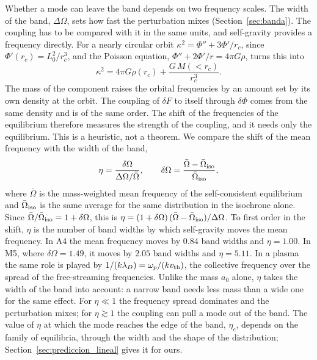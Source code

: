 \documentclass[11pt,a4paper]{article}
\begin{document}
Whether a mode can leave the band depends on two frequency scales. The width of the band,
$\Delta\Omega$, sets how fast the perturbation mixes (Section~\ref{sec:banda}). The coupling has to
be compared with it in the same units, and self-gravity provides a frequency directly. For a
nearly circular orbit $\kappa^2=\Phi''+3\Phi'/r_c$, since $\Phi'(r_c)=L_0^2/r_c^3$, and the Poisson
equation, $\Phi''+2\Phi'/r=4\pi G\rho$, turns this into
\[
  \kappa^2=4\pi G\rho(r_c)+\frac{G\,M(<r_c)}{r_c^3}.
\]
The mass of the component raises the orbital frequencies by an amount set by its own
density at the orbit. The coupling of $\delta F$ to itself through $\delta\Phi$ comes from the same
density and is of the same order. The shift of the frequencies of the equilibrium therefore
measures the strength of the coupling, and it needs only the equilibrium. This is a
heuristic, not a theorem. We compare the shift of the mean frequency with the width of the
band,
\[
  \eta=\frac{\delta\Omega}{\Delta\Omega/\bar\Omega},\qquad
  \delta\Omega=\frac{\bar\Omega-\bar\Omega_{\rm iso}}{\bar\Omega_{\rm iso}},
\]
where $\bar\Omega$ is the mass-weighted mean frequency of the self-consistent
equilibrium and $\bar\Omega_{\rm iso}$ is the same average for the same distribution
in the isochrone alone. Since $\bar\Omega/\bar\Omega_{\rm iso}=1+\delta\Omega$, this is
$\eta=(1+\delta\Omega)\,(\bar\Omega-\bar\Omega_{\rm iso})/\Delta\Omega$. To first order in the shift, $\eta$
is the number of band widths by which self-gravity moves the mean frequency. In A4 the mean
frequency moves by $0.84$ band widths and $\eta=1.00$. In M5, where $\delta\Omega=1.49$, it moves
by $2.05$ band widths and $\eta=5.11$. In a plasma the same role is played by
$1/(k\lambda_D)=\omega_p/(kv_{\rm th})$, the collective frequency over the spread of the free-streaming
frequencies. Unlike the mass $a_0$ alone, $\eta$ takes the width of the band into account: a
narrow band needs less mass than a wide one for the same effect. For $\eta\ll1$ the
frequency spread dominates and the perturbation mixes; for $\eta\gtrsim1$ the coupling can
pull a mode out of the band. The value of $\eta$ at which the mode reaches the edge of the
band, $\eta_c$, depends on the family of equilibria, through the width and the shape of the
distribution; Section~\ref{sec:prediccion_lineal} gives it for ours.
\end{document}

